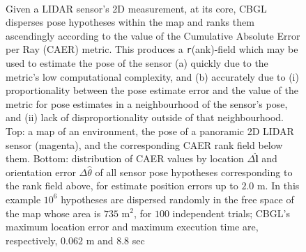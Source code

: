 \begin{figure}\vspace{0.4em}
  \subfloat{    \label{fig:a}} \vspace{-1.7cm}\\
  \subfloat{\hspace{-0.3cm} \label{fig:b}}
  \caption{\small
           Given a LIDAR sensor's 2D measurement, at its core, CBGL disperses
           pose hypotheses within the map and ranks them ascendingly according
           to the value of the Cumulative Absolute Error per Ray (CAER) metric.
           This produces a
           \texttt{r}(ank)-field which may be used to estimate the pose of the
           sensor (a) quickly due to the metric's low computational complexity,
           and (b) accurately due to (i) proportionality between the pose
           estimate error and the value of the metric for pose estimates in a
           neighbourhood of the sensor's pose, and (ii) lack of
           disproportionality outside of that neighbourhood.  Top: a map of an
           environment, the pose of a panoramic 2D LIDAR sensor (magenta), and
           the corresponding CAER rank field below them. Bottom: distribution
           of CAER values by location $\Delta \hat{\bm{l}}$ and orientation
           error $\Delta \hat{\theta}$ of all sensor pose hypotheses
           corresponding to the rank field above, for estimate position errors
           up to $2.0$ m. In this example $10^6$ hypotheses are dispersed
           randomly in the free space of the map whose area is $735$ m$^2$, for
           $100$ independent trials; CBGL's maximum location error and maximum
           execution time are, respectively, $0.062$ m and $8.8$ sec }
  \vspace{-0.65cm}
  \label{fig:face}
\end{figure}

